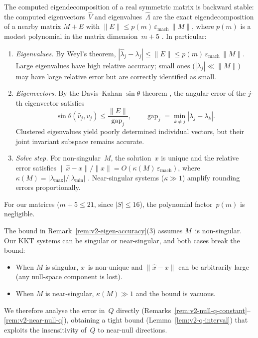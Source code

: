 \begin{remark}%
\label{rem:v2-eigen-accuracy}
The computed eigendecomposition of a real symmetric matrix
is backward stable: the computed eigenvectors~$\hat V$ and
eigenvalues~$\hat\Lambda$ are the exact eigendecomposition
of a nearby matrix $M + E$ with
$\|E\| \leq p(m)\,\varepsilon_{\mathrm{mach}}\,\|M\|$,
where $p(m)$ is a modest polynomial in the matrix
dimension~$m + 5$
\cite[Ch.~8]{GolubVanLoan2013}.
In particular:
\begin{enumerate}
\item \emph{Eigenvalues.}
  By Weyl's theorem,
  $|\hat\lambda_j - \lambda_j| \leq \|E\|
    \leq p(m)\,\varepsilon_{\mathrm{mach}}\,\|M\|$.
  Large eigenvalues have high relative accuracy;
  small ones ($|\lambda_j| \ll \|M\|$) may have large
  relative error but are correctly identified as small.
\item \emph{Eigenvectors.}
  By the Davis--Kahan $\sin\theta$ theorem
  \cite[Ch.~8]{GolubVanLoan2013},
  the angular error of the $j$-th eigenvector satisfies
  \[
    \sin\theta(\hat v_j, v_j)
      \leq \frac{\|E\|}{\operatorname{gap}_j},
    \qquad
    \operatorname{gap}_j
      = \min_{k \neq j} |\lambda_j - \lambda_k|.
  \]
  Clustered eigenvalues yield poorly determined
  individual vectors, but their joint invariant subspace
  remains accurate.
\item \emph{Solve step.}
  For non-singular~$M$, the solution~$x$ is unique and
  the relative error satisfies
  $\|\hat x - x\| / \|x\|
    = O(\kappa(M)\,\varepsilon_{\mathrm{mach}})$,
  where $\kappa(M) = |\lambda_{\max}| / |\lambda_{\min}|$
  \cite[Ch.~5]{Higham2002}.
  Near-singular systems ($\kappa \gg 1$) amplify
  rounding errors proportionally.
\end{enumerate}
For our matrices ($m + 5 \leq 21$, since $|S| \leq 16$),
the polynomial factor~$p(m)$ is negligible.
\end{remark}

\begin{remark}%
\label{rem:v2-solve-step-warning}
The bound in Remark~\ref{rem:v2-eigen-accuracy}(3)
assumes $M$~is non-singular.
Our KKT systems can be singular or near-singular,
and both cases break the bound:
\begin{itemize}
\item When $M$ is singular, $x$~is non-unique and
  $\|\hat x - x\|$ can be arbitrarily large
  (any null-space component is lost).
\item When $M$ is near-singular,
  $\kappa(M) \gg 1$ and the bound is vacuous.
\end{itemize}
We therefore analyse the error in~$Q$ directly
(Remarks~\ref{rem:v2-null-q-constant}--\ref{rem:v2-near-null-q}),
obtaining a tight bound
(Lemma~\ref{lem:v2-q-interval})
that exploits the insensitivity of~$Q$
to near-null directions.
\end{remark}

